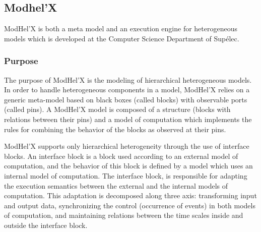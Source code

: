 \documentclass{gemoc} %
\begin{document}
\subsection{Modhel'X}
\label{sec:Modhel_X}
ModHel'X is both a meta model and an execution engine for heterogeneous models which is developed at the Computer Science Department of Sup\'elec.


\subsubsection{Purpose}
The purpose of ModHel'X is the modeling of hierarchical heterogeneous models. In order to handle heterogeneous components in a model, ModHel'X relies on a generic meta-model based on black boxes (called blocks) with observable ports (called pins). A ModHel'X model is composed of a structure (blocks with relations between their pins) and a model of computation which implements the rules for combining the behavior of the blocks as observed at their pins.

ModHel'X supports only hierarchical heterogeneity through the use of interface blocks. An interface block is a block used according to an external model of computation, and the behavior of this block is defined by a model which uses an internal model of computation. The interface block, is responsible for adapting the execution semantics between the external and the internal models of computation. This adaptation is decomposed along three axis: transforming input and output data, synchronizing the control (occurrence of events) in both models of computation, and maintaining relations between the time scales inside and outside the interface block.
\end{document}

